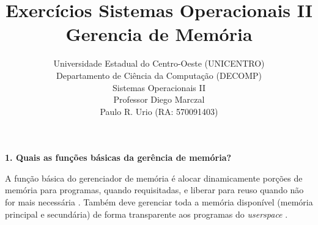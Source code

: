 \documentclass[12pt,a4paper]{article}
\title{Exercícios Sistemas Operacionais II \\ 
	Gerencia de Memória}
\author{Universidade Estadual do Centro-Oeste (UNICENTRO)\\
        Departamento de Ciência da Computação (DECOMP)\\
        Sistemas Operacionais II \\
        Professor Diego Marczal \\
	Paulo R. Urio (RA: 570091403)}
\begin{document}
\maketitle

\noindent \textbf{1. Quais as funções básicas da gerência de memória?}

A função básica do gerenciador de memória é alocar dinamicamente porções
de memória para programas, quando requisitadas, e liberar para reuso 
quando não for mais necessária \cite{IBMMemoryManagement}.  Também deve
gerenciar toda a memória disponível (memória principal e secundária) de 
forma transparente aos programas do \textsl{userspace} 
\cite{http://tldp.org/LDP/tlk/mm/memory.html}.



\end{document}
